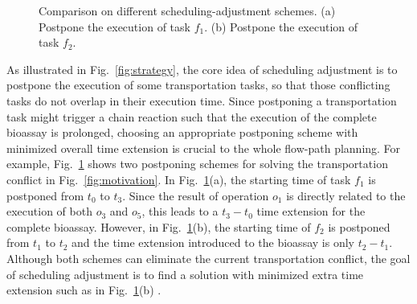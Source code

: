\begin{figure}[t]
    \centering
    \label{ta}
    \label{tb}
	  \caption{Comparison on different scheduling-adjustment schemes. (a) Postpone the execution of task $f_1$. (b) Postpone the execution of task $f_2$. }
	  \label{fig:adjusment_choice}
\end{figure}

As illustrated in Fig.~\ref{fig:strategy}, the core idea of scheduling adjustment is to postpone the execution of some transportation tasks, so that those conflicting tasks do not overlap in their execution time. Since postponing a transportation task might trigger a chain reaction such that the execution of the complete bioassay is prolonged, choosing an appropriate postponing scheme with minimized overall time extension is crucial to the whole flow-path planning. For example, Fig.~\ref{fig:adjusment_choice} shows two postponing schemes for solving the transportation conflict in Fig.~\ref{fig:motivation}. In Fig.~\ref{fig:adjusment_choice}(a), the starting time of task $f_1$ is postponed from $t_0$ to $t_3$. Since the result of operation $o_1$ is directly related to the execution of both $o_3$ and $o_5$, this leads to a $t_3-t_0$ time extension for the complete bioassay. However, in Fig.~\ref{fig:adjusment_choice}(b), the starting time of $f_2$ is postponed from $t_1$ to $t_2$ and the time extension introduced to the bioassay is only $t_2-t_1$. Although both schemes can eliminate the current transportation conflict, the goal of scheduling adjustment is to find a solution with minimized extra time extension such as in Fig.~\ref{fig:adjusment_choice}(b) .

